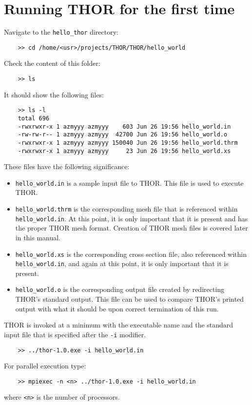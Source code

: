 \section{Running THOR for the first time}
Navigate to the \verb"hello_thor" directory:
\begin{verbatim}
    >> cd /home/<usr>/projects/THOR/THOR/hello_world
\end{verbatim}
Check the content of this folder:
\begin{verbatim}
    >> ls
\end{verbatim}
It should show the following files:
\begin{verbatim}
    >> ls -l
    total 696
    -rwxrwxr-x 1 azmyyy azmyyy    603 Jun 26 19:56 hello_world.in
    -rw-rw-r-- 1 azmyyy azmyyy  42700 Jun 26 19:56 hello_world.o
    -rwxrwxr-x 1 azmyyy azmyyy 150040 Jun 26 19:56 hello_world.thrm
    -rwxrwxr-x 1 azmyyy azmyyy     23 Jun 26 19:56 hello_world.xs
\end{verbatim}
These files have the following significance: 
\begin{itemize}
    \item \verb"hello_world.in" is a sample input file to THOR. This file is used to execute THOR.
    \item \verb"hello_world.thrm" is the corresponding mesh file that is referenced within \verb"hello_world.in". At this point, it is only important that it is present and has the proper THOR mesh format. Creation of THOR mesh files is covered later in this manual.
    \item \verb"hello_world.xs" is the corresponding cross section file, also referenced within \verb"hello_world.in", and again at this point, it is only important that it is present.
    \item \verb"hello_world.o" is the corresponding output file created by redirecting THOR's standard output. This file can be used to compare THOR's printed output with what it should be upon correct termination of this run.
\end{itemize}
THOR is invoked at a minimum with the executable name and the standard input file that is specified after the \verb"-i" modifier.
\begin{verbatim}
    >> ../thor-1.0.exe -i hello_world.in
\end{verbatim}
For parallel execution type:
\begin{verbatim}
    >> mpiexec -n <n> ../thor-1.0.exe -i hello_world.in
\end{verbatim}
where \verb"<n>" is the number of processors.
